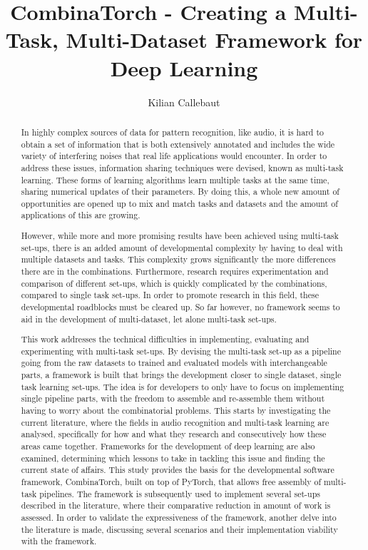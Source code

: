 \documentclass[12pt]{report}
\title{CombinaTorch - Creating a Multi-Task, Multi-Dataset Framework for Deep Learning}
\author{Kilian Callebaut}
\begin{document}
	\maketitle
	
	
	\begin{abstract}
		In highly complex sources of data for pattern recognition, like audio, it is hard to obtain a set of information that is both extensively annotated and includes the wide variety of interfering noises that real life applications would encounter. In order to address these issues, information sharing techniques were devised, known as multi-task learning. These forms of learning algorithms learn multiple tasks at the same time, sharing numerical updates of their parameters. By doing this, a whole new amount of opportunities are opened up to mix and match tasks and datasets and the amount of applications of this are growing.
		
		However, while more and more promising results have been achieved using multi-task set-ups, there is an added amount of developmental complexity by having to deal with multiple datasets and tasks. This complexity grows significantly the more differences there are in the combinations. Furthermore, research requires experimentation and comparison of different set-ups, which is quickly complicated by the combinations, compared to single task set-ups. In order to promote research in this field, these developmental roadblocks must be cleared up. So far however, no framework seems to aid in the development of multi-dataset, let alone multi-task set-ups.
		
		This work addresses the technical difficulties in implementing, evaluating and experimenting with multi-task set-ups. By devising the multi-task set-up as a pipeline going from the raw datasets to trained and evaluated models with interchangeable parts, a framework is built that brings the development closer to single dataset, single task learning set-ups. The idea is for developers to only have to focus on implementing single pipeline parts, with the freedom to assemble and re-assemble them without having to worry about the combinatorial problems. This starts by investigating the current literature, where the fields in audio recognition and multi-task learning are analysed, specifically for how and what they research and consecutively how these areas came together. Frameworks for the development of deep learning are also examined, determining which lessons to take in tackling this issue and finding the current state of affairs. This study provides the basis for the developmental software framework, CombinaTorch, built on top of PyTorch, that allows free assembly of multi-task pipelines. The framework is subsequently used to implement several set-ups described in the literature, where their comparative reduction in amount of work is assessed. In order to validate the expressiveness of the framework, another delve into the literature is made, discussing several scenarios and their implementation viability with the framework.
	\end{abstract}
\end{document}
